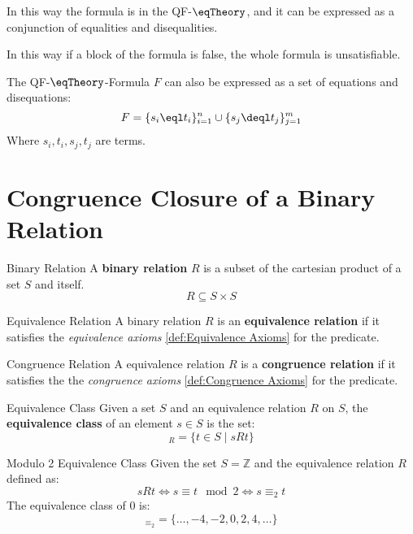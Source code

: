 In this way the formula is in the QF-$\eqTheory$, and it can be 
expressed as a conjunction of equalities and disequalities.

In this way if a block of the formula is false, the whole formula is unsatisfiable.

The QF-$\eqTheory$-Formula $F$ can also be expressed as a set of equations and disequations:
\begin{equation*}
    F = \{ s_i \eql t_i \}_{i=1}^{n} \cup \{ s_j \deql t_j \}_{j=1}^{m}
\end{equation*}
Where $s_i, t_i, s_j, t_j$ are terms.

\section{Congruence Closure of a Binary Relation}
\label{sec:Congruence Closure of a Binary Relation}

\begin{definition}{Binary Relation}
    A \textbf{binary relation} $R$ is a subset of the cartesian product 
    of a set $S$ and itself.
    \begin{equation*}
        R \subseteq S \times S
    \end{equation*}
\end{definition}

\begin{definition}{Equivalence Relation}
    A binary relation $R$ is an \textbf{equivalence relation} if it satisfies the 
    \textit{equivalence axioms} \ref{def:Equivalence Axioms} for the predicate.
    
\end{definition}

\begin{definition}{Congruence Relation}
    A equivalence relation $R$ is a \textbf{congruence relation} if it satisfies the 
    the \textit{congruence axioms} \ref{def:Congruence Axioms} for the predicate.
\end{definition}

\begin{definition}{Equivalence Class}
    Given a set $S$ and an equivalence relation $R$ on $S$, 
    the \textbf{equivalence class} of an element $s \in S$ is the set:
    \begin{equation*}
        [s]_R = \{ t \in S \; | \; sRt \}
    \end{equation*}
\end{definition}

\begin{example}{Modulo 2 Equivalence Class}
    Given the set $S = \mathbb{Z}$ and the equivalence relation $R$ defined as:
    \begin{equation*}
        sRt \iff s \equiv t \mod 2 \iff s \equiv_2 t
    \end{equation*}
    The equivalence class of $0$ is:
    \begin{equation*}
        [0]_{\equiv_2} = \{ \dots, -4, -2, 0, 2, 4, \dots \}
    \end{equation*}
\end{example}

